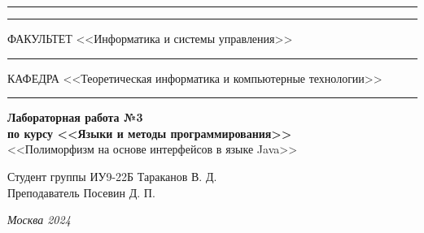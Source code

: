 \documentclass[a4paper, 14pt]{extarticle}
\begin{document}
\begin{titlepage}
		\vspace{-25pt}
		\hspace{-35pt}\rule{\textwidth}{2.3pt}
		
		\vspace*{-20.3pt}
		\hspace{-35pt}\rule{\textwidth}{0.4pt}
		
		\vspace{1.5ex}
		\hspace{-35pt} \noindent \small ФАКУЛЬТЕТ\hspace{80pt} <<Информатика и системы управления>>
		
		\vspace*{-16pt}
		\hspace{47pt}\rule{0.83\textwidth}{0.4pt}
		
		\vspace{0.5ex}
		\hspace{-35pt} \noindent \small КАФЕДРА\hspace{50pt} <<Теоретическая информатика и компьютерные технологии>>
		
		\vspace*{-16pt}
		\hspace{30pt}\rule{0.866\textwidth}{0.4pt}
		
		\vspace{11em}
		
		\begin{center}
			\Large {\bf Лабораторная работа №3} \\ 
			\large {\bf по курсу <<Языки и методы программирования>>} \\
			\large <<Полиморфизм на основе интерфейсов в языке Java>> 
		\end{center}\normalsize
		
		\vspace{8em}
		
		
		\begin{flushright}
			{Студент группы ИУ9-22Б Тараканов В. Д. \hspace*{15pt}\\ 
				\vspace{2ex}
				Преподаватель Посевин Д. П.\hspace*{15pt}}
		\end{flushright}
		
		\bigskip
		
		\vfill
		
		
		\begin{center}
			\textsl{Москва 2024}
		\end{center}
	\end{titlepage}
	
\end{document}
